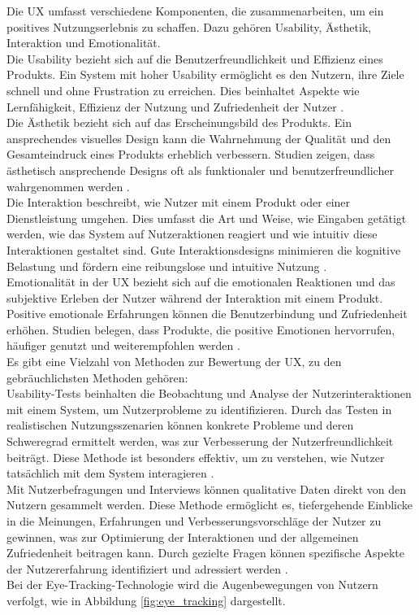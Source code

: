 Die UX umfasst verschiedene Komponenten, die zusammenarbeiten, um ein positives Nutzungserlebnis zu schaffen. Dazu gehören Usability, Ästhetik, Interaktion und Emotionalität.\\
Die Usability bezieht sich auf die Benutzerfreundlichkeit und Effizienz eines Produkts. 
Ein System mit hoher Usability ermöglicht es den Nutzern, ihre Ziele schnell und ohne Frustration zu erreichen. 
Dies beinhaltet Aspekte wie Lernfähigkeit, Effizienz der Nutzung und Zufriedenheit der Nutzer \cite[S.23 ff.]{Nielsen}.\\
Die Ästhetik bezieht sich auf das Erscheinungsbild des Produkts. 
Ein ansprechendes visuelles Design kann die Wahrnehmung der Qualität und den Gesamteindruck eines Produkts erheblich verbessern. 
Studien zeigen, dass ästhetisch ansprechende Designs oft als funktionaler und benutzerfreundlicher wahrgenommen werden \cite{Tractinsky}.\\
Die Interaktion beschreibt, wie Nutzer mit einem Produkt oder einer Dienstleistung umgehen. 
Dies umfasst die Art und Weise, wie Eingaben getätigt werden, wie das System auf Nutzeraktionen reagiert und wie intuitiv diese Interaktionen gestaltet sind. 
Gute Interaktionsdesigns minimieren die kognitive Belastung und fördern eine reibungslose und intuitive Nutzung \cite{interaction_design}.\\
Emotionalität in der UX bezieht sich auf die emotionalen Reaktionen und das subjektive Erleben der Nutzer während der Interaktion mit einem Produkt. 
Positive emotionale Erfahrungen können die Benutzerbindung und Zufriedenheit erhöhen. 
Studien belegen, dass Produkte, die positive Emotionen hervorrufen, häufiger genutzt und weiterempfohlen werden \cite{emotion}.\\

Es gibt eine Vielzahl von Methoden zur Bewertung der UX, zu den gebräuchlichsten Methoden gehören:\\
Usability-Tests beinhalten die Beobachtung und Analyse der Nutzerinteraktionen mit einem System, um Nutzerprobleme zu identifizieren. 
Durch das Testen in realistischen Nutzungsszenarien können konkrete Probleme und deren Schweregrad ermittelt werden, was zur Verbesserung der Nutzerfreundlichkeit beiträgt. 
Diese Methode ist besonders effektiv, um zu verstehen, wie Nutzer tatsächlich mit dem System interagieren \cite[S.165 ff.]{Nielsen}.\\
Mit Nutzerbefragungen und Interviews können qualitative Daten direkt von den Nutzern gesammelt werden. 
Diese Methode ermöglicht es, tiefergehende Einblicke in die Meinungen, Erfahrungen und Verbesserungsvorschläge der Nutzer zu gewinnen, was zur Optimierung der Interaktionen und der allgemeinen Zufriedenheit beitragen kann. 
Durch gezielte Fragen können spezifische Aspekte der Nutzererfahrung identifiziert und adressiert werden \cite{ux_bewertung_interview}.\\
Bei der Eye-Tracking-Technologie wird die Augenbewegungen von Nutzern verfolgt, wie in Abbildung \ref{fig:eye_tracking} dargestellt. 


